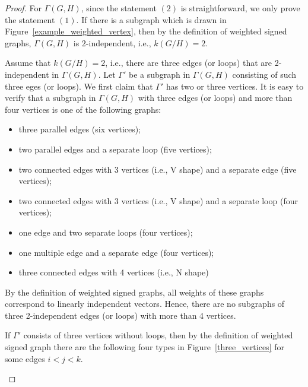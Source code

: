 \documentclass{amsart}
\theoremstyle{definition}
\theoremstyle{remark}
\numberwithin{equation}{section}
\begin{document}
\begin{proof}
For $\Gamma(G,H)$, since the statement $(2)$ is straightforward, we only prove the statement $(1)$.
If there is a subgraph which is drawn in Figure~\ref{example_weighted_vertex}, then by the definition of weighted signed graphs, $\Gamma(G,H)$ is $2$-independent, i.e., $k(G/H)=2$. 
 
Assume that $k(G/H)=2$, i.e., there are three edges (or loops) that are 2-independent in $\Gamma(G,H)$.
Let $\Gamma'$ be a subgraph in $\Gamma(G,H)$ consisting of such three eges (or loops). 
We first claim that $\Gamma'$ has two or three vertices.
It is easy to verify that a subgraph in $\Gamma(G,H)$ with three edges (or loops) and more than four vertices is one of the following graphs: 
\begin{itemize}
\item three parallel edges (six vertices);
\item two parallel edges and a separate loop (five vertices);
\item two connected edges with 3 vertices (i.e., V shape) and a separate edge (five vertices);
\item two connected edges with 3 vertices (i.e., V shape) and a separate loop (four vertices);
\item one edge and two separate loops (four vertices);
\item one multiple edge and a separate edge (four vertices);
\item three connected edges with 4 vertices (i.e., N shape)
\end{itemize}
By the definition of weighted signed graphs, all weights of these graphs correspond to linearly independent vectors. 
Hence, there are no subgraphs of three 2-independent edges (or loops) with more than 4 vertices.

If $\Gamma'$ consists of three vertices without loops, then by the definition of weighted signed graph there are the following four types in Figure~\ref{three_vertices} for some edges $i<j<k$.
\begin{figure}[H]
\end{figure}
\end{proof}
\end{document}
